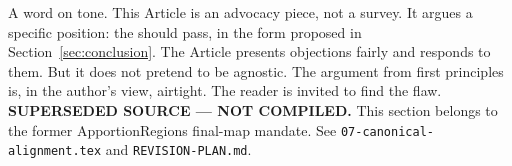 A word on tone.
This Article is an advocacy piece, not a survey.
It argues a specific position: the \dia{} should pass, in the form
proposed in Section~\ref{sec:conclusion}.
The Article presents objections fairly and responds to them.
But it does not pretend to be agnostic.
The argument from first principles is, in the author's view, airtight.
The reader is invited to find the flaw.
\noindent\textbf{SUPERSEDED SOURCE --- NOT COMPILED.} This section belongs to
the former ApportionRegions final-map mandate. See
\texttt{07-canonical-alignment.tex} and \texttt{REVISION-PLAN.md}.
